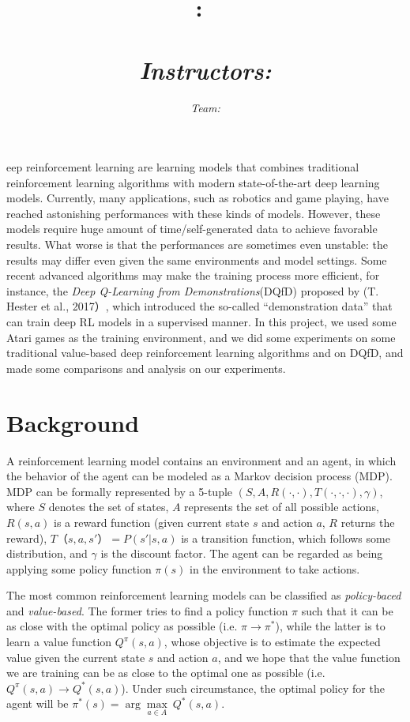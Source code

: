 \documentclass{article}
\title{
   \vspace{-1.5cm}
  \hmwkClass:\ \hmwkTitle\\
  \textbf{\hmwkTopic} \\
  \vspace{0.1in}\large{\textit{Instructors: \hmwkClassInstructor}}
}
\author{
    \textit{Team: \textbf{\hmwkTeam}}
}
\date{}
\begin{document}
\maketitle
\thispagestyle{empty}
\thispagestyle{fancy}
{}

\lettrine[findent=1pt]{}{ }eep reinforcement learning are learning models that combines traditional reinforcement learning algorithms with modern state-of-the-art deep learning models. Currently, many applications, such as robotics and game playing, have reached astonishing performances with these kinds of models. However, these models require huge amount of time/self-generated data to achieve favorable results. What worse is that the performances are sometimes even unstable: the results may differ even given the same environments and model settings. Some recent advanced algorithms may make the training process more efficient, for instance, the \emph{Deep Q-Learning from Demonstrations}(DQfD) proposed by (T. Hester et al., 2017）\cite{DBLP:journals/corr/HesterVPLSPSDOA17}, which introduced the so-called ``demonstration data'' that can train deep RL models in a supervised manner. In this project, we used some Atari games as the training environment, and we did some experiments on some traditional value-based deep reinforcement learning algorithms and on DQfD, and made some comparisons and analysis on our experiments.

\section{Background}
A reinforcement learning model contains an environment and an agent, in which the behavior of the agent can be modeled as a Markov decision process (MDP). MDP can be formally represented by a 5-tuple $(S,A,R(\cdot,\cdot),T(\cdot, \cdot, \cdot),\gamma)$, where $S$ denotes the set of states, $A$ represents the set of all possible actions, $R(s,a)$ is a reward function (given current state $s$ and action $a$, $R$ returns the reward), $T（s,a,s'）=P(s'|s,a)$ is a transition function, which follows some distribution, and $\gamma$ is the discount factor. The agent can be regarded as being applying some policy function $\pi(s)$ in the environment to take actions.\par

The most common reinforcement learning models can be classified as \emph{policy-baced} and \emph{value-based}. The former tries to find a policy function $\pi$ such that it can be as close with the optimal policy as possible (i.e. $\pi \rightarrow \pi^*$), while the latter is to learn a value function $Q^\pi (s,a)$, whose objective is to estimate the expected value given the current state $s$ and action $a$, and we hope that the value function we are training can be as close to the optimal one as possible (i.e. $Q^\pi (s,a) \rightarrow Q^* (s,a)$). Under such circumstance, the optimal policy for the agent will be $\pi^*(s) = \arg \underset{a \in A}\max\ Q^*(s,a)$.\par
\end{document}
